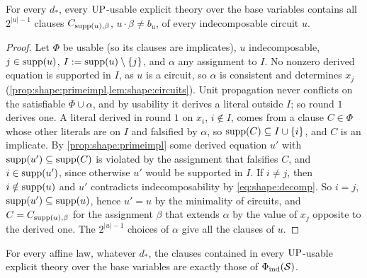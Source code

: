 \begin{proposition}\label{prop:shape:forced}
For every $d_*$, every $\mathrm{UP}$-usable explicit theory over the base variables contains all $2^{\lvert u\rvert-1}$ clauses $C_{\operatorname{supp}(u),\beta}$, $u\cdot\beta\ne b_u$, of every indecomposable circuit $u$.
\end{proposition}

\begin{proof}
Let $\Phi$ be usable (so its clauses are implicates), $u$ indecomposable, $j\in\operatorname{supp}(u)$, $I:=\operatorname{supp}(u)\setminus\{j\}$, and $\alpha$ any assignment to $I$. No nonzero derived equation is supported in $I$, as $u$ is a circuit, so $\alpha$ is consistent and determines $x_j$ (\cref{prop:shape:primeimpl,lem:shape:circuits}). Unit propagation never conflicts on the satisfiable $\Phi\cup\alpha$, and by usability it derives a literal outside $I$; so round $1$ derives one. A literal derived in round $1$ on $x_i$, $i\notin I$, comes from a clause $C\in\Phi$ whose other literals are on $I$ and falsified by $\alpha$, so $\operatorname{supp}(C)\subseteq I\cup\{i\}$, and $C$ is an implicate. By \cref{prop:shape:primeimpl} some derived equation $u'$ with $\operatorname{supp}(u')\subseteq\operatorname{supp}(C)$ is violated by the assignment that falsifies $C$, and $i\in\operatorname{supp}(u')$, since otherwise $u'$ would be supported in $I$. If $i\ne j$, then $i\notin\operatorname{supp}(u)$ and $u'$ contradicts indecomposability by \eqref{eq:shape:decomp}. So $i=j$, $\operatorname{supp}(u')\subseteq\operatorname{supp}(u)$, hence $u'=u$ by the minimality of circuits, and $C=C_{\operatorname{supp}(u),\beta}$ for the assignment $\beta$ that extends $\alpha$ by the value of $x_j$ opposite to the derived one. The $2^{\lvert u\rvert-1}$ choices of $\alpha$ give all the clauses of $u$.
\end{proof}

\begin{proposition}\label{prop:shape:onlyforced}
For every affine law, whatever $d_*$, the clauses contained in every $\mathrm{UP}$-usable explicit theory over the base variables are exactly those of $\Phi_{\rm ind}(\mathcal S)$.
\end{proposition}

